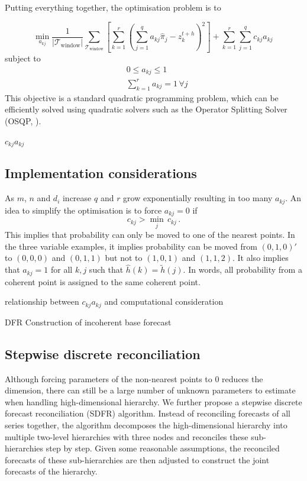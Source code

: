 \documentclass[a4paper,review,12pt,authoryear]{elsarticle}
\begin{document}
      

      Putting everything together, the optimisation problem is to 
      
      \[
      \underset{a_{kj}}{\min} \frac{1}{|\mathcal{T}_{\textrm{window}}|}\sum\limits_{\mathcal{T}_{\textrm{window}}}\left[\sum\limits_{k=1}^r\left(\sum\limits_{j=1}^q a_{kj}\hat{{\pi}}_j-z^{t+h}_k\right)^2\right] + \sum\limits_{k=1}^r\sum\limits_{j=1}^q c_{kj}a_{kj}\,
      \]
      subject to
      \begin{align*}
      &0\leq a_{kj}\leq 1\\
      &\sum\limits_{k=1}^r a_{kj} = 1 \,\forall j
      \end{align*}
      This objective is a standard quadratic programming problem, which can be efficiently solved using quadratic solvers such as the Operator Splitting Solver (OSQP, \citealp{stellatoOSQPOperatorSplitting2020}).  

      {\color{red} $c_{kj}a_{kj}$}

      

      \subsection{Implementation considerations}
      
      As $m$, $n$ and $d_i$ increase $q$ and $r$ grow exponentially resulting in too many $a_{kj}$. An idea to simplify the optimisation is to force $a_{kj}=0$ if 
      \[
       c_{kj}>\underset{j}{\min}\,c_{kj}\,.
      \]  
      This implies that probability can only be moved to one of the nearest points. In the three variable examples, it implies probability can be moved from $(0,1,0)'$ to $(0,0,0)$ and $(0,1,1)$ but not to $(1,0,1)$ and $(1,1,2)$. It also implies that $a_{kj}=1$ for all $k,j$ such that $\hat{h}(k)=\tilde{h}(j)$. In words, all probability from a coherent point is assigned to the same coherent point.

      {\color{red} relationship between  $c_{kj}a_{kj}$ and computational consideration}

      {\color{red} DFR}
      {\color{red} Construction of incoherent base forecast}
  
     \subsection{Stepwise discrete reconciliation}
  
     Although forcing parameters of the non-nearest points to 0 reduces the dimension, there can still be a large number of unknown parameters to estimate when handling high-dimensional hierarchy.
     We further propose a stepwise discrete forecast reconciliation (SDFR) algorithm.
     Instead of reconciling forecasts of all series together,  the algorithm
     decomposes the high-dimensional hierarchy into multiple two-level hierarchies with three nodes and reconciles these sub-hierarchies step by step.
     Given some reasonable assumptions, the reconciled forecasts of these sub-hierarchies are then adjusted to construct the joint forecasts of the hierarchy.
  
\end{document}
